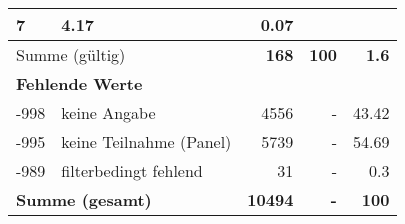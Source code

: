 \begin{longtable}{lXrrr}
       \num{7} &
       \num[round-mode=places,round-precision=2]{4,17} &
         \num[round-mode=places,round-precision=2]{0,07} \\
     \midrule
     \multicolumn{2}{l}{Summe (gültig)} &
       \textbf{\num{168}} &
     \textbf{100} &
       \textbf{\num[round-mode=places,round-precision=2]{1,6}} \\
     \multicolumn{5}{l}{\textbf{Fehlende Werte}}\\
       -998 &
       keine Angabe &
         \num{4556} &
        - &
         \num[round-mode=places,round-precision=2]{43,42} \\
       -995 &
       keine Teilnahme (Panel) &
         \num{5739} &
        - &
         \num[round-mode=places,round-precision=2]{54,69} \\
       -989 &
       filterbedingt fehlend &
         \num{31} &
        - &
         \num[round-mode=places,round-precision=2]{0,3} \\
     \midrule
     \multicolumn{2}{l}{\textbf{Summe (gesamt)}} &
          \textbf{\num{10494}} &
        \textbf{-} &
        \textbf{100} \\
     \bottomrule
     \end{longtable}
     
